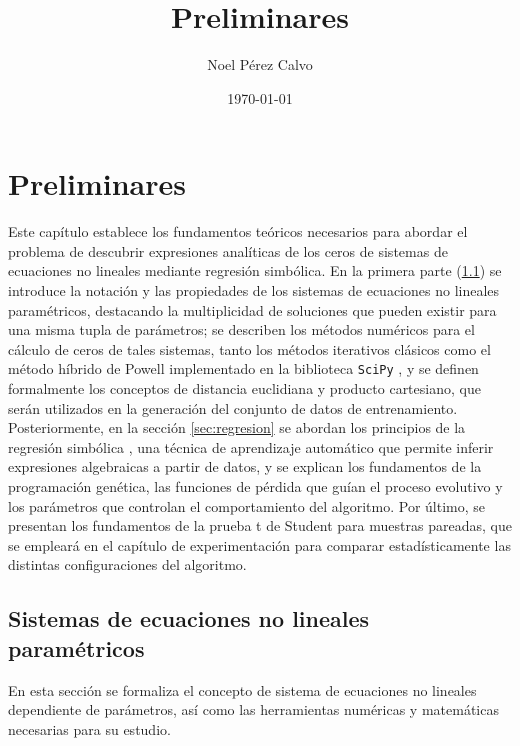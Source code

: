 \documentclass{article}
\title{Preliminares}
\author{Noel Pérez Calvo}
\date{\today}
\begin{document}
\maketitle

\section{Preliminares}
\label{sec:preliminares}

Este capítulo establece los fundamentos teóricos necesarios para
abordar el problema de descubrir expresiones analíticas de los ceros
de sistemas de ecuaciones no lineales mediante regresión simbólica. En
la primera parte (\ref{sec:sistemas}) se introduce la notación y las
propiedades de los sistemas de ecuaciones no lineales paramétricos,
destacando la multiplicidad de soluciones que pueden existir para una
misma tupla de parámetros; se describen los métodos numéricos para el
cálculo de ceros de tales sistemas, tanto los métodos iterativos
clásicos como el método híbrido de Powell implementado en la
biblioteca \texttt{SciPy} \cite{virtanen2020scipy}, y se definen
formalmente los conceptos de distancia euclidiana y producto
cartesiano, que serán utilizados en la generación del conjunto de
datos de entrenamiento. Posteriormente, en la
sección \ref{sec:regresion} se abordan los principios de la regresión
simbólica \cite{koza1992genetic}, una técnica de aprendizaje
automático que permite inferir expresiones algebraicas a partir de
datos, y se explican los fundamentos de la programación genética, las
funciones de pérdida que guían el proceso evolutivo y los parámetros
que controlan el comportamiento del algoritmo. Por último, se
presentan los fundamentos de la prueba t de Student para muestras
pareadas, que se empleará en el capítulo de experimentación para
comparar estadísticamente las distintas configuraciones del algoritmo.

\subsection{Sistemas de ecuaciones no lineales paramétricos}
\label{sec:sistemas}

En esta sección se formaliza el concepto de sistema de ecuaciones no
lineales dependiente de parámetros, así como las herramientas
numéricas y matemáticas necesarias para su estudio.
\end{document}
